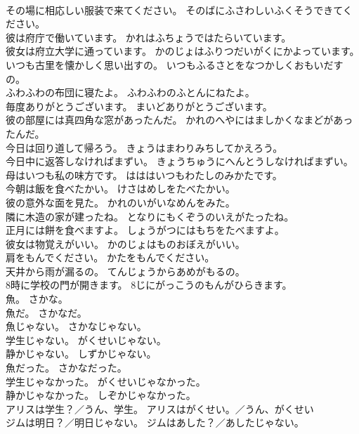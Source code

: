 \documentclass[8pt]{extreport}
\begin{document}
\begin{CJK}{UTF8}{min}
\\	その場に相応しい服装で来てください。	そのばにふさわしいふくそうできてください。 
\\	彼は府庁で働いています。	かれはふちょうではたらいています。 
\\	彼女は府立大学に通っています。	かのじょはふりつだいがくにかよっています。 
\\	いつも古里を懐かしく思い出すの。	いつもふるさとをなつかしくおもいだすの。 
\\	ふわふわの布団に寝たよ。	ふわふわのふとんにねたよ。 
\\	毎度ありがとうございます。	まいどありがとうございます。 
\\	彼の部屋には真四角な窓があったんだ。	かれのへやにはましかくなまどがあったんだ。 
\\	今日は回り道して帰ろう。	きょうはまわりみちしてかえろう。 
\\	今日中に返答しなければまずい。	きょうちゅうにへんとうしなければまずい。 
\\	母はいつも私の味方です。	はははいつもわたしのみかたです。 
\\	今朝は飯を食べたかい。	けさはめしをたべたかい。 
\\	彼の意外な面を見た。	かれのいがいなめんをみた。 
\\	隣に木造の家が建ったね。	となりにもくぞうのいえがたったね。 
\\	正月には餅を食べますよ。	しょうがつにはもちをたべますよ。 
\\	彼女は物覚えがいい。	かのじょはものおぼえがいい。 
\\	肩をもんでください。	かたをもんでください。 
\\	天井から雨が漏るの。	てんじょうからあめがもるの。 
\\	8時に学校の門が開きます。	8じにがっこうのもんがひらきます。 
\\	魚。	さかな。 
\\	魚だ。	さかなだ。 
\\	魚じゃない。	さかなじゃない。 
\\	学生じゃない。	がくせいじゃない。 
\\	静かじゃない。	しずかじゃない。 
\\	魚だった。	さかなだった。 
\\	学生じゃなかった。	がくせいじゃなかった。 
\\	静かじゃなかった。	しぞかじゃなかった。 
\\	アリスは学生？／うん、学生。	アリスはがくせい。／うん、がくせい 
\\	ジムは明日？／明日じゃない。	ジムはあした？／あしたじゃない。 

\end{CJK}
\end{document}

